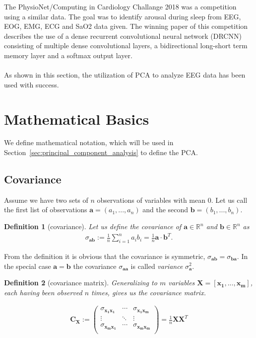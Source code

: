 \documentclass[a4paper]{IEEEtran}
\newtheorem{definition}{Definition}
\begin{document}
The PhysioNet/Computing in Cardiology Challange 2018 was a competition using a similar data\cite{Ghassemi2018}. The goal was to identify arousal during sleep from EEG, EOG, EMG, ECG and SaO2 data given. The winning paper of this competition describes the use of a dense recurrent convolutional neural network (DRCNN) consisting of multiple dense convolutional layers, a bidirectional long-short term memory layer and a softmax output layer\cite{Howe2018}.
\\
\\
As shown in this section, the utilization of PCA to analyze EEG data has been used with success.

\section{Mathematical Basics}
\label{sec:mathematical_basics}

We define mathematical notation, which will be used in Section~\ref{sec:principal_component_analysis} to define the PCA.

\subsection{Covariance}
Assume we have two sets of $n$ observations of variables with mean 0. Let us call the first list of observations $\mathbf{a} = (a_1, ..., a_n)$ and the second $\mathbf{b} = (b_1, ..., b_n)$.

\begin{definition}[covariance]
Let us define the \textit{covariance} of $\mathbf{a} \in \mathbb{R}^n$ and $\mathbf{b} \in \mathbb{R}^n$ as
\begin{align*}
	\sigma_{\mathbf{ab}} := \frac{1}{n} \sum_{i=1}^{n}a_ib_i = \frac{1}{n}\mathbf{a}\cdot\mathbf{b}^T.
\end{align*}
\end{definition}

From the definition it is obvious that the covariance is symmetric, $\sigma_{\mathbf{ab}} = \sigma_{\mathbf{ba}}$. In the special case $\mathbf{a} = \mathbf{b}$ the covariance $\sigma_{\mathbf{aa}}$ is called \textit{variance} $\sigma_{\mathbf{a}}^2$.

\begin{definition}[covariance matrix]
Generalizing to $m$ variables $\mathbf{X} = [\mathbf{x_1}, ..., \mathbf{x_m}]$, each having been observed $n$ times, gives us the \textit{covariance matrix}.

\begin{align*}
	\mathbf{C_X} := \left(\begin{matrix}
		\sigma_{\mathbf{x_1x_1}}	& \cdots & \sigma_{\mathbf{x_1x_m}}	\\
		\vdots						& \ddots & \vdots					\\
		\sigma_{\mathbf{x_mx_1}}	& \cdots & \sigma_{\mathbf{x_mx_m}}	\\
	\end{matrix}\right) = \frac{1}{n} \mathbf{X}\mathbf{X}^T
\end{align*}
\end{definition}
\end{document}
